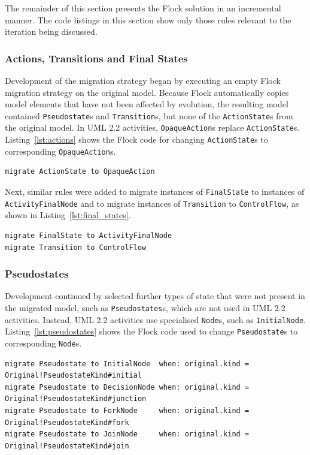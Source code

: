 The remainder of this section presents the Flock solution in an incremental manner. The code listings in this section show only those rules relevant to the iteration being discussed.

\subsubsection{Actions, Transitions and Final States}
Development of the migration strategy began by executing an empty Flock migration strategy on the original model. Because Flock automatically copies model elements that have not been affected by evolution, the resulting model contained \texttt{Ps\-eu\-do\-st\-at\-e}s and \texttt{Tr\-an\-si\-ti\-on}s, but none of the \texttt{Ac\-ti\-onSt\-a\-te}s from the original model. In UML 2.2 activities, \texttt{Op\-aq\-ueAc\-ti\-on}s replace \texttt{Ac\-ti\-onSt\-a\-te}s. Listing~\ref{lst:actions} shows the Flock code for changing \texttt{Ac\-ti\-onSt\-a\-te}s to corresponding \texttt{Op\-aq\-ueAc\-ti\-on}s.

\begin{lstlisting}[caption=Migrating Actions, label=lst:actions, language=Flock]
migrate ActionState to OpaqueAction
\end{lstlisting}

Next, similar rules were added to migrate instances of \texttt{FinalState} to instances of \texttt{ActivityFinalNode} and to migrate instances of \texttt{Transition} to \texttt{ControlFlow}, as shown in Listing~\ref{lst:final_states}.

\begin{lstlisting}[caption=Migrating FinalStates and Transitions, label=lst:final_states, language=Flock]
migrate FinalState to ActivityFinalNode
migrate Transition to ControlFlow
\end{lstlisting}

\subsubsection{Pseudostates}
Development continued by selected further types of state that were not present in the migrated model, such as \texttt{Ps\-eu\-do\-st\-at\-es}s, which are not used in UML 2.2 activities. Instead, UML 2.2 activities use specialised \texttt{No\-de}s, such as \texttt{In\-it\-ialNo\-de}. Listing~\ref{lst:pseudostates} shows the Flock code used to change \texttt{Ps\-eu\-do\-st\-a\-te}s to corresponding \texttt{No\-de}s.

\begin{lstlisting}[caption=Migrating Pseudostates, label=lst:pseudostates, language=Flock]
migrate Pseudostate to InitialNode  when: original.kind = Original!PseudostateKind#initial
migrate Pseudostate to DecisionNode when: original.kind = Original!PseudostateKind#junction
migrate Pseudostate to ForkNode     when: original.kind = Original!PseudostateKind#fork
migrate Pseudostate to JoinNode     when: original.kind = Original!PseudostateKind#join
\end{lstlisting}

